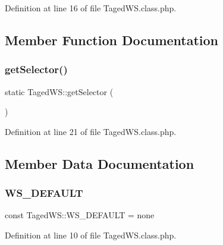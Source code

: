 Definition at line 16 of file Taged\+W\+S.\+class.\+php.



\subsection{Member Function Documentation}
\mbox{\label{class_taged_w_s_a6b2d6df992d84326e2aa6f2a42f74548}} 
\subsubsection{\texorpdfstring{get\+Selector()}{getSelector()}}
{\footnotesize\ttfamily static Taged\+W\+S\+::get\+Selector (\begin{DoxyParamCaption}{ }\end{DoxyParamCaption})\hspace{0.3cm}{\ttfamily [static]}}



Definition at line 21 of file Taged\+W\+S.\+class.\+php.



\subsection{Member Data Documentation}
\mbox{\label{class_taged_w_s_ae4e78af248665b98dc686301ec4aaecb}} 
\subsubsection{\texorpdfstring{W\+S\+\_\+\+D\+E\+F\+A\+U\+LT}{WS\_DEFAULT}}
{\footnotesize\ttfamily const Taged\+W\+S\+::\+W\+S\+\_\+\+D\+E\+F\+A\+U\+LT = \textquotesingle{}none\textquotesingle{}}



Definition at line 10 of file Taged\+W\+S.\+class.\+php.

\mbox{\label{class_taged_w_s_aeb078fb0a692eb87d8fba680e1dd0a03}} 
